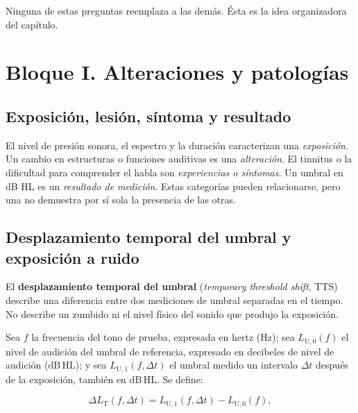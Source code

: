Ninguna de estas preguntas reemplaza a las demás. Ésta es la idea organizadora
del capítulo.

\section{Bloque I. Alteraciones y patologías}
\label{sec:u8-alteraciones}

\subsection{Exposición, lesión, síntoma y resultado}

El nivel de presión sonora, el espectro y la duración caracterizan una
\emph{exposición}. Un cambio en estructuras o funciones auditivas es una
\emph{alteración}. El tinnitus o la dificultad para comprender el habla son
\emph{experiencias o síntomas}. Un umbral en dB HL es un \emph{resultado de
medición}. Estas categorías pueden relacionarse, pero una no demuestra por sí
sola la presencia de las otras.


\subsection{Desplazamiento temporal del umbral y exposición a ruido}
\label{sec:u8-tts}

El \textbf{desplazamiento temporal del umbral} (\emph{temporary threshold
shift}, TTS) describe una diferencia entre dos mediciones de umbral separadas
en el tiempo. No describe un zumbido ni el nivel físico del sonido que produjo
la exposición.

Sea \(f\) la frecuencia del tono de prueba, expresada en hertz
(\(\mathrm{Hz}\)); sea \(L_{\mathrm{U},0}(f)\) el nivel de audición del umbral
de referencia, expresado en decibeles de nivel de audición
(\(\mathrm{dB\,HL}\)); y sea \(L_{\mathrm{U},1}(f,\Delta t)\) el umbral medido
un intervalo \(\Delta t\) después de la exposición, también en
\(\mathrm{dB\,HL}\). Se define:

\begin{equation}
    \Delta L_{\mathrm{T}}(f,\Delta t)
    =
    L_{\mathrm{U},1}(f,\Delta t)-L_{\mathrm{U},0}(f),
    \label{eq:u8-tts}
\end{equation}

